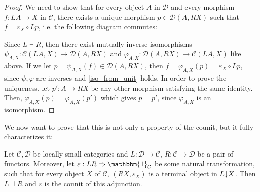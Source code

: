 \begin{proof} We need to show that for every object $A$ in $\mathcal{D}$ and every morphism $f:LA\to X$ in $\mathcal{C}$, there exists a unique morphism $p\in\mathcal{D}(A,RX)$ such that $f=\varepsilon_X\circ Lp$, i.e. the following diagram commutes:
\begin{center}
\end{center}
Since $L\dashv R$, then there exist mutually inverse isomorphisms $\psi_{A,X}:\mathcal{C}(LA,X)\to\mathcal{D}(A,RX)$ and $\varphi_{A,X}:\mathcal{D}(A,RX)\to\mathcal{C}(LA,X)$ like above. If we let $p=\psi_{A,X}(f)\in\mathcal{D}(A,RX)$, then $f=\varphi_{A,X}(p)=\varepsilon_X\circ Lp$, since $\psi,\varphi$ are inverses and \eqref{iso_from_unit} holds. In order to prove the uniqueness, let $p':A\to RX$ be any other morphism satisfying the same identity. Then, $\varphi_{A,X}(p)=\varphi_{A,X}(p')$ which gives $p=p'$, since $\varphi_{A,X}$ is an isomorphism.
\end{proof}
We now want to prove that this is not only a property of the counit, but it fully characterizes it:
\begin{theorem}[co-2.3.6]\label{th:alternative_def} Let $\mathcal{C},\mathcal{D}$ be locally small categories and $L:\mathcal{D}\to\mathcal{C}$, $R:\mathcal{C}\to\mathcal{D}$ be a pair of functors. Moreover, let $\varepsilon:LR\Rightarrow\mathbbm{1}_{\mathcal{C}}$ be some natural transformation, such that for every object $X$ of $\mathcal{C}$, $(RX,\varepsilon_X)$ is a terminal object in $L\mkern-5mu\downarrow\mkern-5mu X$. Then $L\dashv R$ and $\varepsilon$ is the counit of this adjunction.
\end{theorem}
